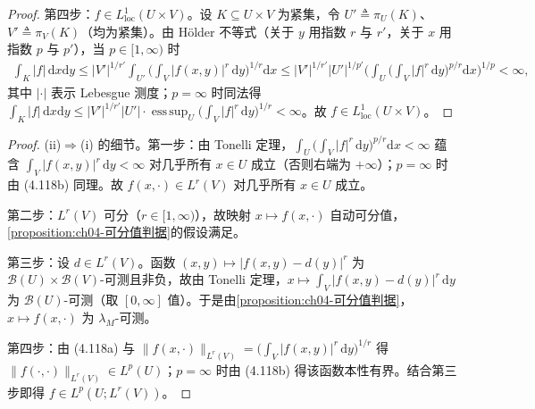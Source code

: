 \documentclass[../../main.tex]{subfiles}%
\begin{document}
\begin{proof}
第四步：$f\in L^1_{\mathrm{loc}}(U\times V)$。设 $K\subseteq U\times V$ 为紧集，令 $U'\triangleq\pi_U(K)$、$V'\triangleq\pi_V(K)$（均为紧集）。由 Hölder 不等式（关于 $y$ 用指数 $r$ 与 $r'$，关于 $x$ 用指数 $p$ 与 $p'$），当 $p\in[1,\infty)$ 时
\begin{align*}
\int_K|f|\,\mathrm{d}x\mathrm{d}y\leqslant|V'|^{1/r'}\int_{U'}\Big(\int_V|f(x,y)|^r\,\mathrm{d}y\Big)^{1/r}\mathrm{d}x
\leqslant|V'|^{1/r'}|U'|^{1/p'}\Big(\int_U\Big(\int_V|f|^r\,\mathrm{d}y\Big)^{p/r}\mathrm{d}x\Big)^{1/p}<\infty,
\end{align*}
其中 $|\cdot|$ 表示 Lebesgue 测度；$p=\infty$ 时同法得 $\int_K|f|\,\mathrm{d}x\mathrm{d}y\leqslant|V'|^{1/r'}|U'|\cdot\operatorname*{ess\,sup}_U\big(\int_V|f|^r\,\mathrm{d}y\big)^{1/r}<\infty$。故 $f\in L^1_{\mathrm{loc}}(U\times V)$。
\end{proof}

\begin{proof}
(ii)$\Rightarrow$(i) 的细节。第一步：由 Tonelli 定理，$\int_U\big(\int_V|f|^r\,\mathrm{d}y\big)^{p/r}\mathrm{d}x<\infty$ 蕴含 $\int_V|f(x,y)|^r\,\mathrm{d}y<\infty$ 对几乎所有 $x\in U$ 成立（否则右端为 $+\infty$）；$p=\infty$ 时由 (4.118b) 同理。故 $f(x,\cdot)\in L^r(V)$ 对几乎所有 $x\in U$ 成立。

第二步：$L^r(V)$ 可分（$r\in[1,\infty)$），故映射 $x\mapsto f(x,\cdot)$ 自动可分值，\cref{proposition:ch04-可分值判据}的假设满足。

第三步：设 $d\in L^r(V)$。函数 $(x,y)\mapsto|f(x,y)-d(y)|^r$ 为 $\mathcal{B}(U)\times\mathcal{B}(V)$-可测且非负，故由 Tonelli 定理，$x\mapsto\int_V|f(x,y)-d(y)|^r\,\mathrm{d}y$ 为 $\mathcal{B}(U)$-可测（取 $[0,\infty]$ 值）。于是由\cref{proposition:ch04-可分值判据}，$x\mapsto f(x,\cdot)$ 为 $\lambda_M$-可测。

第四步：由 (4.118a) 与 $\|f(x,\cdot)\|_{L^r(V)}=\big(\int_V|f(x,y)|^r\,\mathrm{d}y\big)^{1/r}$ 得 $\|f(\cdot,\cdot)\|_{L^r(V)}\in L^p(U)$；$p=\infty$ 时由 (4.118b) 得该函数本性有界。结合第三步即得 $f\in L^p(U;L^r(V))$。
\end{proof}
\end{document}
